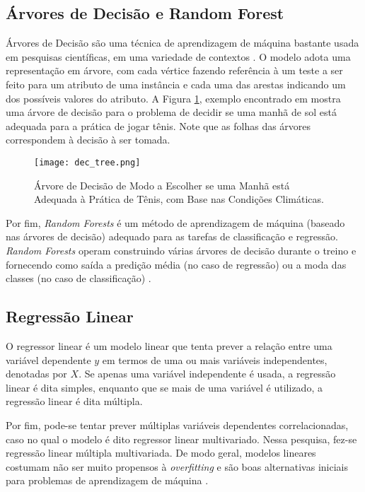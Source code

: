\subsection{Árvores de Decisão e Random Forest}
Árvores de Decisão são uma técnica de aprendizagem de máquina bastante usada em
pesquisas científicas, em uma variedade de contextos \cite{ml_mitchell}. O modelo
adota uma representação em árvore, com cada vértice fazendo referência à um teste a ser
feito para um atributo de uma instância e cada uma das arestas indicando um dos
possíveis valores do atributo. A Figura \ref{dec_tree}, exemplo encontrado em
\cite{ml_mitchell} mostra uma árvore de decisão para o problema de decidir se uma
manhã de sol está adequada para a prática de jogar tênis. Note que as folhas das
árvores correspondem à decisão à ser tomada. 

\begin{figure}[!ht]
    \caption{Árvore de Decisão de Modo a Escolher se uma Manhã está Adequada à
    Prática de Tênis, com Base nas Condições Climáticas.} 
    \centering
    \texttt{[image: dec\_tree.png]}
    \label{dec_tree}
\end{figure}

\par Por fim, \textit{Random Forests} é um método de aprendizagem de máquina (baseado nas
árvores de decisão) adequado para as tarefas
de classificação e regressão. \textit{Random Forests} operam construindo várias árvores de
decisão durante o treino e fornecendo como saída a predição média (no caso de
regressão) ou a moda das classes (no caso de classificação) \cite{random_forest}. 

\subsection{Regressão Linear}
O regressor linear é um modelo linear que tenta prever a relação entre uma variável
dependente $y$ em termos de uma ou mais variáveis independentes, denotadas por $X$.
Se apenas uma variável independente é usada, a regressão linear é dita simples,
enquanto que se mais de uma variável é utilizado, a regressão linear é dita
múltipla. 
\par Por fim, pode-se tentar prever múltiplas variáveis dependentes
correlacionadas, caso no qual o modelo é dito regressor linear multivariado. Nessa
pesquisa, fez-se regressão linear múltipla multivariada. 
De modo geral, modelos lineares costumam não ser muito propensos à
\textit{overfitting} e são boas alternativas iniciais para problemas de aprendizagem
de máquina \cite{ml_book}. 

